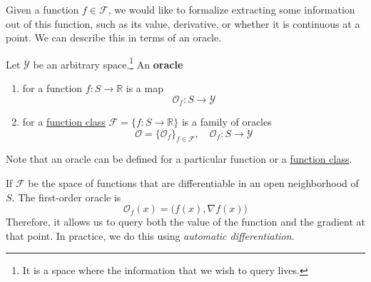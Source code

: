 Given a function $f \in \mathcal{F}$, we would like to formalize extracting some information out of this function, such as its value, derivative, or whether it is continuous at a point. We can describe this in terms of an oracle. 

\begin{definition}[Oracle]
  \label{def:oracle}
	Let $\mathcal{Y}$ be an arbitrary space.\footnote{It is a space where the information that we wish to query lives.} An \textbf{oracle} 
	\begin{enumerate}
		\item for a function $f: S \to \mathbb{R}$ is a map
			\begin{equation}
				\mathcal{O}_f: S \to \mathcal{Y}
			\end{equation}

		\item for a \hyperref[def:function-class]{function class} $\mathcal{F} = \{f : S \to \mathbb{R}\}$ is a family of oracles 
			\begin{equation}
				\mathcal{O} = \{\mathcal{O}_f\}_{f \in \mathcal{F}}, \quad \mathcal{O}_f: S \to \mathcal{Y}
			\end{equation}
	\end{enumerate}
\end{definition}

Note that an oracle can be defined for a particular function or a \hyperref[def:function-class]{function class}. 

\begin{example}
  \label{ex:first-order-oracle}
	If $\mathcal{F}$ be the space of functions that are differentiable in an open neighborhood of $S$. The first-order oracle is 
	\begin{equation}
		\mathcal{O}_f (x) = \big( f(x), \nabla f(x) \big)
	\end{equation}
	Therefore, it allows us to query both the value of the function and the gradient at that point. In practice, we do this using \textit{automatic differentiation}. 
\end{example}

